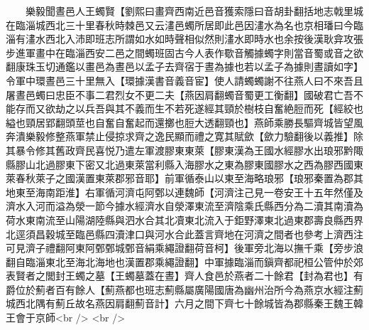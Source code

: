 　　樂毅聞晝邑人王蠋賢【劉熙曰畫齊西南近邑音獲索隱曰音胡卦翻括地志戟里城在臨淄城西北三十里春秋時棘邑又云澅邑蠋所居即此邑因澅水為名也京相璠曰今臨淄有澅水西北入沛即班志所謂如水如時聲相似然則澅水即時水也余按後漢耿弇攻張步進軍畫中在臨淄西安二邑之間蠋班固古今人表作歜音觸據蠋字則當音蜀或音之欲翻康珠玉切通鑑以畫邑為晝邑以孟子去齊宿于晝為據也若以孟子為據則晝讀如字】令軍中環晝邑三十里無入【環據漢書音義音宦】使人請蠋蠋謝不往燕人曰不來吾且屠晝邑蠋曰忠臣不事二君烈女不更二夫【燕因肩翻蠋音蜀更工衡翻】國破君亡吾不能存而又欲劫之以兵吾與其不義而生不若死遂經其頸於樹枝自奮絶脰而死【經絞也縊也頸居郢翻頭莖也自奮自奮起而還擲也脰大透翻頸也】燕師乘勝長驅齊城皆望風奔潰樂毅修整燕軍禁止侵掠求齊之逸民顯而禮之寛其賦歛【歛力驗翻後以義推】除其暴令修其舊政齊民喜悦乃遣左軍渡膠東東萊【膠東漢為王國水經膠水出琅邪黔陬縣膠山北過膠東下密又北過東萊當利縣入海膠水之東為膠東國膠水之西為膠西國東萊春秋萊子之國漢置東萊郡邪音耶】前軍循泰山以東至海略琅邪【琅邪秦置為郡其地東至海南距淮】右軍循河濟屯阿鄄以連魏師【河濟注己見一卷安王十五年然僅及濟水入河而溢為滎一節今據水經濟水自滎澤東流至濟陰乘氏縣西分為二瀆其南瀆為荷水東南流至山陽湖陸縣與泗水合其北凟東北流入于鉅野澤東北過東郡壽良縣西界北逕須昌穀城至臨邑縣四瀆津口與河水合此蓋言齊地在河濟之間者也參考上濟西注可見濟子禮翻阿東阿鄄鄄城鄄音絹乘繩證翻荷音柯】後軍旁北海以撫千乘【旁步浪翻自臨淄東北至海北海地也漢置郡乘繩證翻】中軍據臨淄而鎭齊都祀桓公管仲於郊表賢者之閭封王蠋之墓【王蠋墓蓋在晝】齊人食邑於燕者二十餘君【封為君也】有爵位於薊者百有餘人【薊燕都也班志薊縣屬廣陽國唐為幽州治所今為燕京水經注薊城西北隅有薊丘故名燕因肩翻薊音計】六月之間下齊七十餘城皆為郡縣秦王魏王韓王會于京師<br />
<br />
